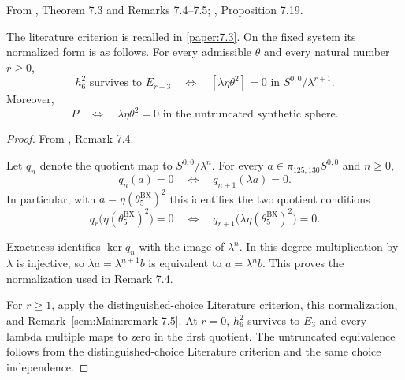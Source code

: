 \begin{theorem}
\label{sem:Main:any-choice-criterion}
From \cite{LWX126}, Theorem 7.3 and Remarks 7.4--7.5; \cite{BurklundXu}, Proposition 7.19.\par
The literature criterion is recalled in \ref{paper:7.3}. On the fixed system its normalized form is as follows.
For every admissible $\theta$ and every natural number $r\geq0$,
\[
 h_6^2\text{ survives to }E_{r+3}
 \quad\Longleftrightarrow\quad
 [\lambda\eta\theta^2]=0\text{ in }S^{0,0}/\lambda^{r+1}.
\]
Moreover,
\[
 P\quad\Longleftrightarrow\quad\lambda\eta\theta^2=0
 \text{ in the untruncated synthetic sphere}.
\]
\end{theorem}
\begin{proof}
From \cite{LWX126}, Remark 7.4.\par
Let $q_n$ denote the quotient map to $S^{0,0}/\lambda^n$. For every $a\in\pi_{125,130}S^{0,0}$ and $n\geq0$,
\[
 q_n(a)=0\quad\Longleftrightarrow\quad q_{n+1}(\lambda a)=0.
\]
In particular, with $a=\eta(\theta_5^{\mathrm{BX}})^2$ this identifies the two quotient conditions
\[
 q_r\bigl(\eta(\theta_5^{\mathrm{BX}})^2\bigr)=0
 \quad\Longleftrightarrow\quad
 q_{r+1}\bigl(\lambda\eta(\theta_5^{\mathrm{BX}})^2\bigr)=0.
\]

Exactness identifies $\ker q_n$ with the image of $\lambda^n$. In this degree multiplication by $\lambda$ is injective, so $\lambda a=\lambda^{n+1}b$ is equivalent to $a=\lambda^n b$. This proves the normalization used in Remark 7.4.

For $r\geq1$, apply the distinguished-choice Literature criterion, this normalization, and Remark~\ref{sem:Main:remark-7.5}. At $r=0$, $h_6^2$ survives to $E_3$ and every lambda multiple maps to zero in the first quotient. The untruncated equivalence follows from the distinguished-choice Literature criterion and the same choice independence.
\end{proof}

